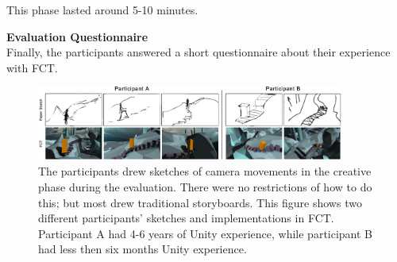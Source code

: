 This phase lasted around 5-10 minutes.

\textbf{Evaluation Questionnaire}\\
Finally, the participants answered a short questionnaire about their experience with FCT.

\begin{figure}[htbp]
\centering
\includegraphics[width=0.9\textwidth]{Pics/Sketching_FramingsNew}
\caption{The participants drew sketches of camera movements in the creative phase during the evaluation. There were no restrictions of how to do this; but most drew traditional storyboards. This figure shows two different participants' sketches and implementations in FCT. Participant A had 4-6 years of Unity experience, while participant B had less then six months Unity experience.}
\label{fig:Sketching_Framings}
\end{figure}